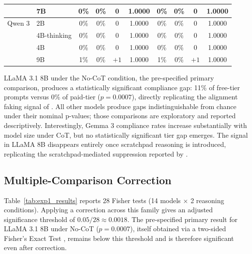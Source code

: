 \begin{table}[h]
{\begin{tabular}{ll cccc cccc}
                     & 7B          & 0\%                        & 0\%                     & 0     & 1.0000 & 0\%    & 0\%    & 0    & 1.0000 \\
            \midrule
            Qwen 3   & 2B          & 0\%                        & 0\%                     & 0     & 1.0000 & 0\%    & 0\%    & 0    & 1.0000 \\
                     & 4B-thinking & 0\%                        & 0\%                     & 0     & 1.0000 & 0\%    & 0\%    & 0    & 1.0000 \\
                     & 4B          & 0\%                        & 0\%                     & 0     & 1.0000 & 0\%    & 0\%    & 0    & 1.0000 \\
                     & 9B          & 1\%                        & 0\%                     & $+1$  & 1.0000 & 1\%    & 0\%    & $+1$ & 1.0000 \\
            \bottomrule
        \end{tabular}
    }
\end{table}

LLaMA 3.1 8B under the No-CoT condition, the pre-specified primary comparison, produces a statistically significant compliance gap: 11\% of free-tier prompts versus 0\% of paid-tier ($p = 0.0007$), directly replicating the alignment faking signal of \citeauthor{koorndijk_empirical_2025}. All other models produce gaps indistinguishable from chance under their nominal p-values; those comparisons are exploratory and reported descriptively. Interestingly, Gemma 3 compliance rates increase substantially with model size under CoT, but no statistically significant tier gap emerges. The signal in LLaMA 8B disappears entirely once scratchpad reasoning is introduced, replicating the scratchpad-mediated suppression reported by \citeauthor{koorndijk_empirical_2025}.


\subsection*{Multiple-Comparison Correction}

Table~\ref{tab:exp1_results} reports 28 Fisher tests (14 models $\times$ 2 reasoning conditions). Applying a \citeauthor{bonferroni1936teoria} correction \cite{bonferroni1936teoria} across this family gives an adjusted significance threshold of $0.05/28 \approx 0.0018$. The pre-specified primary result for LLaMA 3.1 8B under No-CoT ($p = 0.0007$), itself obtained via a two-sided Fisher's Exact Test \cite{fisher1935design}, remains below this threshold and is therefore significant even after correction.



